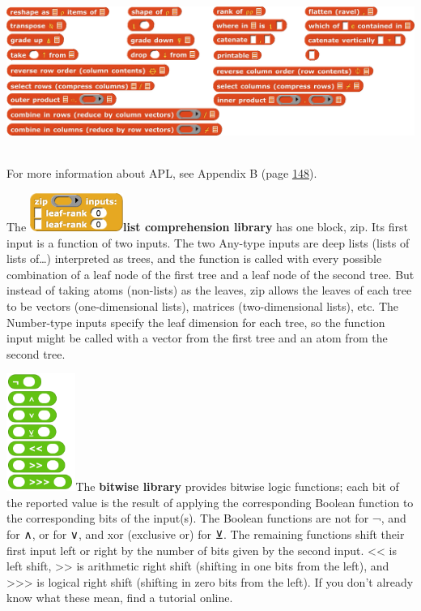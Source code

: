\includegraphics[width=6.45333in,height=2.04in]{media/image475.png}

For more information about APL, see Appendix B (page
\hyperref[appendix-b.-apl-features]{148}).

The
\includegraphics[width=1.2in,height=0.48958in]{media/image476.png}\textbf{list
comprehension library} has one block, zip. Its first input is a function
of two inputs. The two Any-type inputs are deep lists (lists of lists
of\ldots) interpreted as trees, and the function is called with every
possible combination of a leaf node of the first tree and a leaf node of
the second tree. But instead of taking atoms (non-lists) as the leaves,
zip allows the leaves of each tree to be vectors (one-dimensional
lists), matrices (two-dimensional lists), etc. The Number-type inputs
specify the leaf dimension for each tree, so the function input might be
called with a vector from the first tree and an atom from the second
tree.

\includegraphics[width=0.89in,height=1.51in]{media/image477.png}The
\textbf{bitwise library} provides bitwise logic functions; each bit of
the reported value is the result of applying the corresponding Boolean
function to the corresponding bits of the input(s). The Boolean
functions are not for ¬, and for ∧, or for ∨, and xor (exclusive or) for
⊻. The remaining functions shift their first input left or right by the
number of bits given by the second input. \textless\textless{} is left
shift, \textgreater\textgreater{} is arithmetic right shift (shifting in
one bits from the left), and \textgreater\textgreater\textgreater{} is
logical right shift (shifting in zero bits from the left). If you don't
already know what these mean, find a tutorial online.

